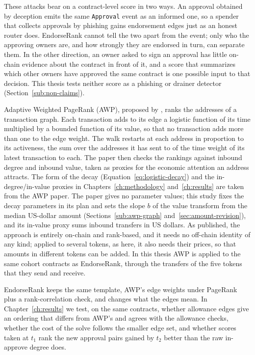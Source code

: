 These attacks bear on a contract-level score in two ways. An approval obtained by deception emits the same \texttt{Approval} event as an informed one, so a spender that collects approvals by phishing gains endorsement edges just as an honest router does. EndorseRank cannot tell the two apart from the event; only who the approving owners are, and how strongly they are endorsed in turn, can separate them. In the other direction, an owner asked to sign an approval has little on-chain evidence about the contract in front of it, and a score that summarizes which other owners have approved the same contract is one possible input to that decision. This thesis tests neither score as a phishing or drainer detector (Section~\ref{sub:non-claims}).


Adaptive Weighted PageRank (AWP), proposed by \textcite{do2023awp}, ranks the addresses of a transaction graph. Each transaction adds to its edge a logistic function of its time multiplied by a bounded function of its value, so that no transaction adds more than one to the edge weight. The walk restarts at each address in proportion to its activeness, the sum over the addresses it has sent to of the time weight of its latest transaction to each. The paper then checks the rankings against inbound degree and inbound value, taken as proxies for the economic attention an address attracts. The form of the decay (Equation~\eqref{eq:logistic-decay}) and the in-degree/in-value proxies in Chapters~\ref{ch:methodology} and~\ref{ch:results} are taken from the AWP paper. The paper gives no parameter values; this study fixes the decay parameters in its plan and sets the slope $b$ of the value transform from the median US-dollar amount (Sections~\ref{sub:awp-graph} and~\ref{sec:amount-revision}), and its in-value proxy sums inbound transfers in US dollars. As published, the approach is entirely on-chain and rank-based, and it needs no off-chain identity of any kind; applied to several tokens, as here, it also needs their prices, so that amounts in different tokens can be added. In this thesis AWP is applied to the same cohort contracts as EndorseRank, through the transfers of the five tokens that they send and receive.

EndorseRank keeps the same template, AWP's edge weights under PageRank plus a rank-correlation check, and changes what the edges mean. In Chapter~\ref{ch:results} we test, on the same contracts, whether allowance edges give an ordering that differs from AWP's and agrees with the allowance checks, whether the cost of the solve follows the smaller edge set, and whether scores taken at $t_1$ rank the new approval pairs gained by $t_2$ better than the raw in-approve degree does.

